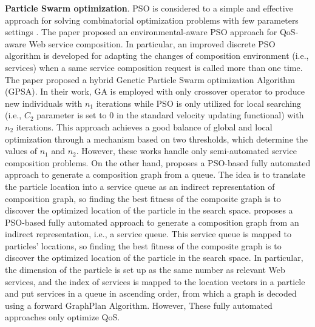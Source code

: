 \textbf{Particle Swarm optimization}.
PSO is considered to a simple and effective approach for solving combinatorial optimization problems with few parameters settings \cite{long2009environment}. The paper \cite{long2009environment} proposed an environmental-aware PSO approach for QoS-aware Web service composition. In particular, an improved discrete PSO algorithm is developed for adapting the changes of composition environment (i.e., services) when a same service composition request is called more than one time. The paper \cite{liu2007hybrid} proposed a hybrid Genetic Particle Swarm optimization Algorithm (GPSA). In their work, GA is employed with only crossover operator to produce new individuals with $n_1$ iterations while PSO is only utilized for local searching (i.e., $C_2$ parameter is set to 0 in the standard velocity updating functional) with $n_2$ iterations. This approach achieves a good balance of global and local optimization through a  mechanism based on two thresholds, which determine the values of $n_1$ and $n_2$. However, these works \cite{liu2007hybrid,long2009environment} handle only semi-automated service composition problems. On the other hand, \cite{da2016particle} proposes a PSO-based fully automated approach to generate a composition graph from a queue. The idea is to translate the particle location into a service queue as an indirect representation of composition  graph, so finding the best fitness of the composite graph is to discover the optimized location of the particle in the search space. \cite{da2016particle} proposes a PSO-based fully automated approach to generate a composition graph from an indirect representation, i.e., a service queue. This service queue is mapped to particles' locations, so finding the best fitness of the composite graph is to discover the optimized location of the particle in the search space. In particular,  the dimension of the particle is set up as the same number as relevant Web services, and the index of services is mapped to the location vectors in a particle and put services in a queue in ascending order, from which a graph is decoded using a forward GraphPlan Algorithm. However, These fully automated approaches only optimize QoS.

